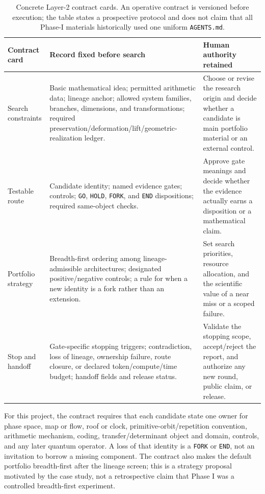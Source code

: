 \begin{table}[H]
\centering
\caption{Concrete Layer-2 contract cards. An operative contract is versioned
before execution; the table states a prospective protocol and does not claim
that all Phase-I materials historically used one uniform \texttt{AGENTS.md}.}
\label{tab:contract}
\small
\renewcommand{\arraystretch}{1.08}
\begin{tabularx}{\linewidth}{@{}p{.20\linewidth}Yp{.27\linewidth}@{}}
\toprule
\textbf{Contract card} & \textbf{Record fixed before search} & \textbf{Human authority retained} \\
\midrule
Search constraints & Basic mathematical idea; permitted arithmetic data; lineage
anchor; allowed system families, branches, dimensions, and transformations;
required preservation/deformation/lift/geometric-realization ledger. &
Choose or revise the research origin and decide whether a candidate is main
portfolio material or an external control. \\
Testable route & Candidate identity; named evidence gates; controls;
\texttt{GO}, \texttt{HOLD}, \texttt{FORK}, and \texttt{END} dispositions;
required same-object checks. &
Approve gate meanings and decide whether the evidence actually earns a
disposition or a mathematical claim. \\
Portfolio strategy & Breadth-first ordering among lineage-admissible
architectures; designated positive/negative controls; a rule for when a new
identity is a fork rather than an extension. &
Set search priorities, resource allocation, and the scientific value of a
near miss or a scoped failure. \\
Stop and handoff & Gate-specific stopping triggers; contradiction, loss of
lineage, ownership failure, route closure, or declared token/compute/time
budget; handoff fields and release status. &
Validate the stopping scope, accept/reject the report, and authorize any new
round, public claim, or release. \\
\bottomrule
\end{tabularx}
\end{table}

For this project, the contract requires that each candidate state one owner for
phase space, map or flow, roof or clock, primitive-orbit/repetition convention,
arithmetic mechanism, coding, transfer/determinant object and domain, controls,
and any later quantum operator. A loss of that identity is a \texttt{FORK} or
\texttt{END}, not an invitation to borrow a missing component. The contract
also makes the default portfolio breadth-first after the lineage screen; this
is a strategy proposal motivated by the case study, not a retrospective claim
that Phase I was a controlled breadth-first experiment.

